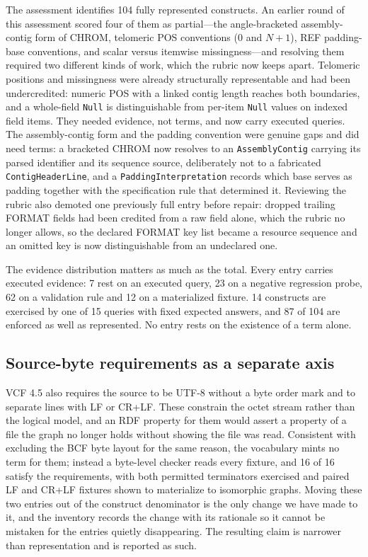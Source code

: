 \documentclass{ceurart}
\newcommand{\term}[1]{\texttt{#1}}
\begin{document}
The assessment identifies 104 fully represented constructs. An earlier round of this assessment scored four of them as partial---the angle-bracketed assembly-contig form of CHROM, telomeric POS conventions (0 and $N+1$), REF padding-base conventions, and scalar versus itemwise missingness---and resolving them required two different kinds of work, which the rubric now keeps apart. Telomeric positions and missingness were already structurally representable and had been undercredited: numeric POS with a linked contig length reaches both boundaries, and a whole-field \term{Null} is distinguishable from per-item \term{Null} values on indexed field items. They needed evidence, not terms, and now carry executed queries. The assembly-contig form and the padding convention were genuine gaps and did need terms: a bracketed CHROM now resolves to an \term{AssemblyContig} carrying its parsed identifier and its sequence source, deliberately not to a fabricated \term{ContigHeaderLine}, and a \term{PaddingInterpretation} records which base serves as padding together with the specification rule that determined it. Reviewing the rubric also demoted one previously full entry before repair: dropped trailing FORMAT fields had been credited from a raw field alone, which the rubric no longer allows, so the declared FORMAT key list became a resource sequence and an omitted key is now distinguishable from an undeclared one.

The evidence distribution matters as much as the total. Every entry carries executed evidence: 7 rest on an executed query, 23 on a negative regression probe, 62 on a validation rule and 12 on a materialized fixture. 14 constructs are exercised by one of 15 queries with fixed expected answers, and 87 of 104 are enforced as well as represented. No entry rests on the existence of a term alone.

\subsection{Source-byte requirements as a separate axis}
\label{sec:serialization}

VCF 4.5 also requires the source to be UTF-8 without a byte order mark and to separate lines with LF or CR+LF. These constrain the octet stream rather than the logical model, and an RDF property for them would assert a property of a file the graph no longer holds without showing the file was read. Consistent with excluding the BCF byte layout for the same reason, the vocabulary mints no term for them; instead a byte-level checker reads every fixture, and 16 of 16 satisfy the requirements, with both permitted terminators exercised and paired LF and CR+LF fixtures shown to materialize to isomorphic graphs. Moving these two entries out of the construct denominator is the only change we have made to it, and the inventory records the change with its rationale so it cannot be mistaken for the entries quietly disappearing. The resulting claim is narrower than representation and is reported as such.
\end{document}
